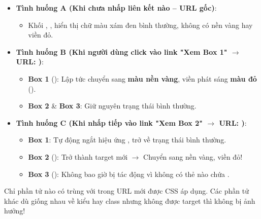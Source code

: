 \begin{browserWindow}
\sffamily\small
\begin{itemize}[leftmargin=1.5em, itemsep=3pt, parsep=0pt]
    \item \textbf{Tình huống A (Khi chưa nhấp liên kết nào -- URL gốc)}:
    \begin{itemize}[leftmargin=1.2em, itemsep=1pt]
        \item Khối , ,  hiển thị chữ màu xám đen bình thường, không có nền vàng hay viền đỏ.
    \end{itemize}
    \item \textbf{Tình huống B (Khi người dùng click vào link "Xem Box 1" $\rightarrow$ URL: )}:
    \begin{itemize}[leftmargin=1.2em, itemsep=1pt]
        \item \textbf{Box 1} (): Lập tức chuyển sang \textbf{màu nền vàng}, viền phát sáng \textbf{màu đỏ} ().
        \item \textbf{Box 2} \& \textbf{Box 3}: Giữ nguyên trạng thái bình thường.
    \end{itemize}
    \item \textbf{Tình huống C (Khi nhấp tiếp vào link "Xem Box 2" $\rightarrow$ URL: )}:
    \begin{itemize}[leftmargin=1.2em, itemsep=1pt]
        \item \textbf{Box 1}: Tự động ngắt hiệu ứng , trở về trạng thái bình thường.
        \item \textbf{Box 2} (): Trở thành target mới $\rightarrow$ Chuyển sang nền vàng, viền đỏ!
        \item \textbf{Box 3} (): Không bao giờ bị tác động vì không có thẻ  nào chứa .
    \end{itemize}
\end{itemize}
\end{browserWindow}

\begin{tipBox}
Chỉ phần tử nào có  trùng với \codeinline{\#} trong URL mới được CSS  áp dụng. Các phần tử khác dù giống nhau về kiểu hay class nhưng không được target thì không bị ảnh hưởng!
\end{tipBox}

